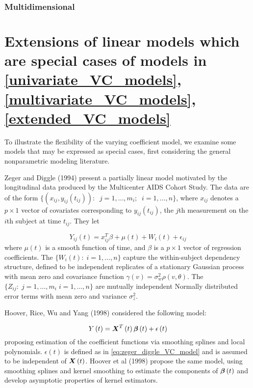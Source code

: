 \documentclass[12pt]{article}
\newcommand*\outlineskeleton{\color{green}}
\newcommand{\bfbeta}{\mbox{\boldmath $\beta$}}
\newcommand{\bfX}{\mbox{\boldmath $X$}}
\begin{document}
\subsubsection{{\outlineskeleton Multidimensional }}



\section{{\outlineskeleton Extensions of linear models which are special cases of models in \ref{univariate_VC_models},\ref{multivariate_VC_models},\ref{extended_VC_models}}}
To illustrate the flexibility of the varying coefficient model, we examine some models that may be expressed as special cases, first considering the general nonparametric modeling literature. 




Zeger and Diggle (1994) present a partially linear model motivated by the longitudinal data produced by the Multicenter AIDS Cohort Study. The data are of the form $\lbrace \left(x_{ij},y_{ij}\left(t_{ij}\right)\right): \;\; j=1,\dots,m_i;\;\;i=1,\dots,n \rbrace$, where $x_{ij}$ denotes a $p \times 1$ vector of covariates corresponding to $y_{ij}\left(t_{ij}\right)$, the $j$th measurement on the $i$th subject at time $t_{ij}$. They let 

\begin{equation} \label{eq:zeger_diggle_VC_model}
Y_{ij}\left(t\right) =  x_{ij}^T\beta + \mu\left(t\right) + W_i\left(t\right) + \epsilon_{ij}
\end{equation}
\noindent
where $\mu\left(t\right)$ is a smooth function of time, and $\beta$ is a $p \times 1$ vector of regression coefficients. The $\lbrace W_i\left(t\right):\;i=1,\dots,n \rbrace$ capture the within-subject dependency structure, defined to be independent replicates of a stationary Gaussian process with mean zero and covariance function $\gamma\left(v\right) = \sigma_w^2\rho\left(v, \theta \right)$. The $\lbrace Z_{ij}:\;j=1,\dots,m_i\;i=1,\dots,n \rbrace$ are mutually independent Normally distributed error terms with mean zero and variance $\sigma_z^2$.

Hoover, Rice, Wu and Yang (1998) considered the following model:

\begin{equation} \label{eq:hoover_rice_wu_VC_model}
Y\left(t\right) =  \bfX^T\left(t\right)\bfbeta \left(t\right) + \epsilon\left(t\right) 
\end{equation}
\noindent
proposing estimation of the coefficient functions via smoothing splines and local polynomials. $\epsilon\left(t\right)$ is defined as in \ref{eq:zeger_diggle_VC_model} and is assumed to be independent of $\bfX\left(t\right)$. Hoover et al (1998) propose the same model, using smoothing splines and kernel smoothing to estimate  the components of $\bfbeta\left(t\right)$ and develop asymptotic properties of kernel estimators. 
\end{document}
